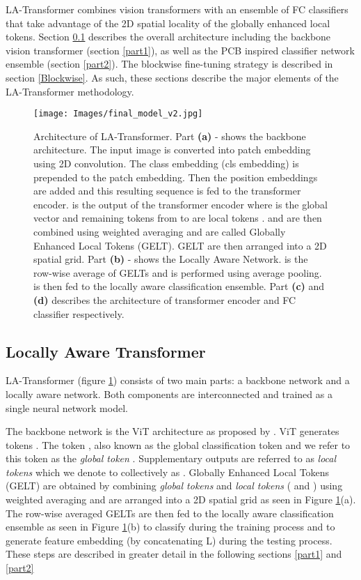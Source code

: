 \documentclass{article}
\begin{document}
LA-Transformer combines vision transformers with an ensemble of FC classifiers that take advantage of the 2D spatial locality of the globally enhanced local tokens.  Section \ref{LA Transformer} describes the overall architecture including the backbone vision transformer (section \ref{part1}), as well as the PCB inspired classifier network ensemble (section \ref{part2}).  The blockwise fine-tuning strategy is described in section \ref{Blockwise}.  As such, these sections describe the major elements of the LA-Transformer methodology.
\label{headings}

\begin{figure}[htp]
    \texttt{[image: Images/final\_model\_v2.jpg]}
    \label{fig1:Model}
    \caption{Architecture of LA-Transformer. Part \textbf{(a)} - shows the backbone architecture. The input image is converted into patch embedding using 2D convolution. The class embedding (cls embedding) is prepended to the patch embedding. Then the position embeddings are added and this resulting sequence is fed to the transformer encoder.  is the output of the transformer encoder where  is the global vector  and remaining tokens from  to  are local tokens .  and  are then combined using weighted averaging and are called Globally Enhanced Local Tokens (GELT). GELT are then arranged into a 2D spatial grid. Part \textbf{(b)} - shows the Locally Aware Network.  is the row-wise average of GELTs and is performed using average pooling.  is then fed to the locally aware classification ensemble. Part \textbf{(c)} and \textbf{(d)} describes the architecture of transformer encoder and FC classifier respectively.
    }
\end{figure}

\subsection{Locally Aware Transformer}\label{LA Transformer}
LA-Transformer (figure \ref{fig1:Model}) consists of two main parts: a backbone network and a locally aware network. Both components are interconnected and trained as a single neural network model.  

The backbone network is the ViT architecture as proposed by \citet{ViT}.
ViT generates tokens . The token , also known as the global classification token and we refer to this token as the \textit{global token} .  Supplementary outputs  are referred to as \textit{local tokens} which we denote to collectively as . Globally Enhanced Local Tokens (GELT) are obtained by combining \textit{global tokens} and \textit{local tokens} ( and ) using weighted averaging and are arranged into a  2D spatial grid as seen in Figure \ref{fig1:Model}(a). The row-wise averaged GELTs are then fed to the locally aware classification ensemble as seen in Figure \ref{fig1:Model}(b) to classify during the training process and to generate feature embedding (by concatenating L) during the testing process. These steps are described in greater detail in the following sections \ref{part1} and \ref{part2}
\end{document}
